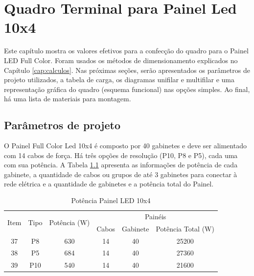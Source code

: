 \chapter{Quadro Terminal para Painel Led 10x4}
Este capítulo mostra os valores efetivos para a confecção do quadro para o Painel LED Full Color. Foram usados os métodos de dimensionamento explicados no Capítulo \ref{cap:calculos}. Nas próximas seções, serão apresentados os parâmetros de projeto utilizados, a tabela de carga, os diagramas unifilar e multifilar e uma representação gráfica do quadro (esquema funcional) nas opções simples. Ao final, há uma lista de materiais para montagem.

\section{Parâmetros de projeto}

O Painel Full Color Led 10x4 é composto por 40 gabinetes e deve ser alimentado com 14 cabos de força. Há três opções de resolução (P10, P8 e P5), cada uma com sua potência. A Tabela \ref{tab:pot_10x4} apresenta as informações de potência de cada gabinete, a quantidade de cabos ou grupos de até 3 gabinetes para conectar à rede elétrica e a quantidade de gabinetes e a potência total do Painel.

\begin{table}[htbp]
\caption{Potência Painel LED 10x4}
\centering
\begin{tabular}{cccccc}
\toprule
\multirow{2}{*}{Item} & \multirow{2}{*}{Tipo} & \multirow{2}{*}{Potência (W)} & \multicolumn{3}{c}{Painéis} \\
\cmidrule{4-6}
& & & Cabos  & Gabinete & Potência Total (W) \\
\midrule


37 & P8 & 630 & 14 & 40 & 25200 \\
38 & P5 & 684 & 14 & 40 & 27360 \\
39 & P10 & 540 & 14 & 40 & 21600 \\


\bottomrule
\end{tabular}
\label{tab:pot_10x4}
\end{table}

